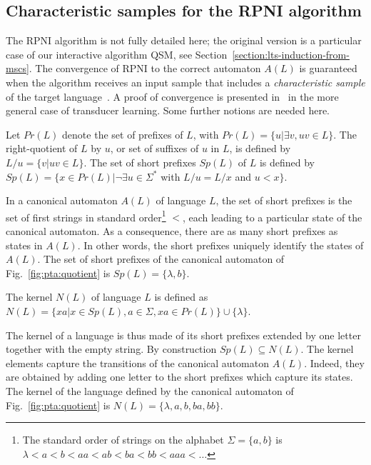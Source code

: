 \subsection{Characteristic samples for the RPNI algorithm\label{subsection:gi-background-rpni}}

The RPNI algorithm is not fully detailed here; the original version is a particular case of our interactive algorithm \textsc{QSM}, see Section~\ref{section:lts-induction-from-mscs}. The convergence of RPNI to the correct automaton $A(L)$ is guaranteed when the algorithm receives an input sample that includes a \textsl{characteristic sample} of the target language~\cite{Oncina:1992}. A proof of convergence is presented in~\cite{Oncina:1993} in the more general case of transducer learning. Some further notions are needed here.

\begin{definition} 
Let $Pr(L)$ denote the set of prefixes of $L$, with $Pr(L) = \{u | \exists v, uv \in L\}$. The right-quotient of $L$ by $u$, or set of suffixes of $u$ in $L$, is defined by $L/u = \{v | uv \in L\}$. The set of short prefixes $Sp(L)$ of $L$ is defined by $Sp(L) = \{x \in Pr(L) | \neg\exists u \in \Sigma^*$ with $L/u = L/x$ and $u < x\}$.
\end{definition}

In a canonical automaton $A(L)$ of language $L$, the set of short prefixes is the set of first strings in standard order\footnote{The standard order of strings on the alphabet $\Sigma=\{a,b\}$ is $\lambda < a < b < aa < ab < ba < bb < aaa < \ldots$} $<$, each leading to a particular state of the canonical automaton. As a consequence, there are as many short prefixes as states in $A(L)$. In other words, the short prefixes uniquely identify the states of $A(L)$. The set of short prefixes of the canonical automaton of Fig.~\ref{fig:pta:quotient} is $Sp(L) = \{\lambda, b\}$.

\begin{definition}
 The kernel $N(L)$ of language $L$ is defined as $N(L) = \{xa | x \in Sp(L), a \in \Sigma, xa \in Pr(L)\} \cup \{\lambda\}$.
\end{definition}

The kernel of a language is thus made of its short prefixes extended by one letter together with the empty string. By construction $Sp(L) \subseteq N(L)$. The kernel elements capture the transitions of the canonical automaton $A(L)$. Indeed, they are obtained by adding one letter to the short prefixes which capture its states. The kernel of the language defined by the canonical automaton of Fig.~\ref{fig:pta:quotient} is $N(L) = \{\lambda, a, b, ba, bb\}$.

